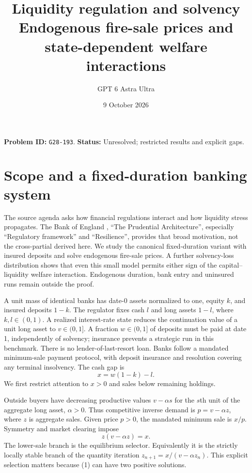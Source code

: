\documentclass[11pt]{article}
\title{Liquidity regulation and solvency\\\large Endogenous fire-sale prices and state-dependent welfare interactions}
\author{GPT 6 Astra Ultra}
\date{9 October 2026}
\theoremstyle{remark}
\begin{document}
\maketitle
\noindent\textbf{Problem ID:} \texttt{G28-193}. \textbf{Status:} Unresolved; restricted results and explicit gaps.

\section{Scope and a fixed-duration banking system}
The source agenda asks how financial regulations interact and how liquidity
stress propagates. The Bank of England \cite{boe}, ``The Prudential
Architecture'', especially ``Regulatory framework'' and ``Resilience'',
provides that broad motivation, not the cross-partial derived here.
We study the canonical fixed-duration variant with insured deposits and
solve endogenous fire-sale prices. A further solvency-loss distribution
shows that even this small model permits either sign of the capital--liquidity
welfare interaction. Endogenous duration, bank entry and uninsured runs
remain outside the proof.

A unit mass of identical banks has date-0 assets normalized to one,
equity $k$, and insured deposits $1-k$. The regulator fixes cash $l$ and
long assets $1-l$, where $k,l\in(0,1)$. A realized interest-rate state
reduces the continuation value of a unit long asset to $v\in(0,1]$.
A fraction $w\in(0,1]$ of deposits must be paid at date 1, independently
of solvency; insurance prevents a strategic run in this benchmark. There
is no lender-of-last-resort loan. Banks follow a mandated minimum-sale
payment protocol, with deposit insurance and resolution covering any
terminal insolvency. The cash gap is
\[
 x=w(1-k)-l.
\]
We first restrict attention to $x>0$ and sales below remaining holdings.

Outside buyers have decreasing productive values $v-\alpha s$ for the
$s$th unit of the aggregate long asset, $\alpha>0$. Thus competitive
inverse demand is $p=v-\alpha z$, where $z$ is aggregate sales.
Given price $p>0$, the mandated minimum sale is $x/p$. Symmetry and
market clearing impose
\[
 z(v-\alpha z)=x. \tag{1}
\]
The lower-sale branch is the equilibrium selector. Equivalently it is the
strictly locally stable branch of the quantity iteration
$z_{n+1}=x/(v-\alpha z_n)$. This explicit selection matters because
(1) can have two positive solutions.
\end{document}
